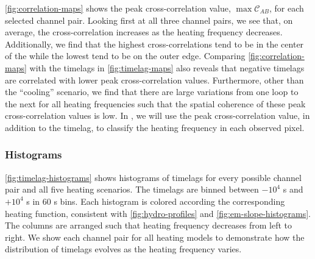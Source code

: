 \autoref{fig:correlation-maps} shows the peak cross-correlation value, $\max\mathcal{C}_{AB}$, for each selected channel pair. Looking first at all three channel pairs, we see that, on average, the cross-correlation increases as the heating frequency decreases. Additionally, we find that the highest cross-correlations tend to be in the center of the \AR{} while the lowest tend to be on the outer edge. Comparing \autoref{fig:correlation-maps} with the timelags in \autoref{fig:timelag-maps} also reveals that negative timelags are correlated with lower peak cross-correlation values. Furthermore, other than the ``cooling'' scenario, we find that there are large variations from one loop to the next for all heating frequencies such that the spatial coherence of these peak cross-correlation values is low. In , we will use the peak cross-correlation value, in addition to the timelag, to classify the heating frequency in each observed pixel.

\subsubsection{Histograms}\label{timelag_histograms}

\autoref{fig:timelag-histograms} shows histograms of timelags for every possible channel pair and all five heating scenarios. The timelags are binned between $-10^4$ s and $+10^4$ s in 60 s bins. Each histogram is colored according the corresponding heating function, consistent with \autoref{fig:hydro-profiles} and \autoref{fig:em-slope-histograms}. The columns are arranged such that heating frequency decreases from left to right. We show each channel pair for all heating models to demonstrate how the distribution of timelags evolves as the heating frequency varies.

